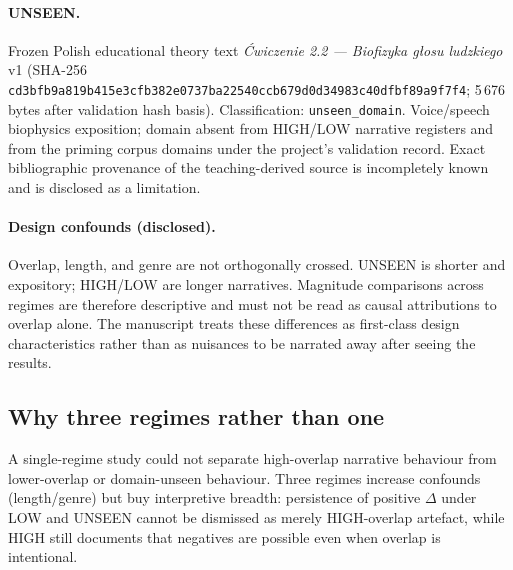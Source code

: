 \paragraph{UNSEEN.}
Frozen Polish educational theory text \emph{\'{C}wiczenie 2.2 --- Biofizyka g\l{}osu ludzkiego} v1
(SHA-256 \texttt{cd3bfb9a819b415e3cfb382e0737ba22540ccb679d0d34983c40dfbf89a9f7f4}; 5\,676 bytes after validation hash basis).
Classification: \texttt{unseen\_domain}.
Voice/speech biophysics exposition; domain absent from HIGH/LOW narrative registers and from the priming corpus domains under the project's validation record.
Exact bibliographic provenance of the teaching-derived source is incompletely known and is disclosed as a limitation.

\paragraph{Design confounds (disclosed).}
Overlap, length, and genre are not orthogonally crossed.
UNSEEN is shorter and expository; HIGH/LOW are longer narratives.
Magnitude comparisons across regimes are therefore descriptive and must not be read as causal attributions to overlap alone.
The manuscript treats these differences as first-class design characteristics rather than as nuisances to be narrated away after seeing the results.


\subsection{Why three regimes rather than one}
A single-regime study could not separate high-overlap narrative behaviour from lower-overlap or domain-unseen behaviour.
Three regimes increase confounds (length/genre) but buy interpretive breadth: persistence of positive $\Delta$ under LOW and UNSEEN cannot be dismissed as merely HIGH-overlap artefact, while HIGH still documents that negatives are possible even when overlap is intentional.
